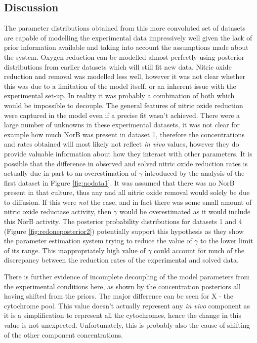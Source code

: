 \subsection{Discussion}
The parameter distributions obtained from this more convoluted set of datasets are capable of modelling the experimental data impressively well given the lack of prior information available and taking into account the assumptions made about the system. Oxygen reduction can be modelled almost perfectly using posterior distributions from earlier datasets which will still fit new data. Nitric oxide reduction and removal was modelled less well, however it was not clear whether this was due to a limitation of the model itself, or an inherent issue with the experimental set-up. In reality it was probably a combination of both which would be impossible to decouple. The general features of nitric oxide reduction were captured in the model even if a precise fit wasn't achieved. There were a large number of unknowns in these experimental datasets, it was not clear for example how much NorB was present in dataset 1, therefore the concentrations and rates obtained will most likely not reflect \textit{in vivo} values, 
however they do provide valuable information about how they interact with other parameters. It is possible that the difference in observed and solved nitric oxide reduction rates is actually due in part to an overestimation of $\gamma$ introduced by the analysis of the first dataset in Figure \ref{fig:nodata1}. It was assumed that there was no NorB present in that culture, thus any and all nitric oxide removal would solely be due to diffusion. If this were \textit{not} the case, and in fact there was some small amount of nitric oxide reductase activity, then $\gamma$ would be overestimated as it would include this NorB activity. The posterior probability distributions for datasets 1 and 4 (Figure \ref{fig:redoneposterior2}) potentially support this hypothesis as they show the parameter estimation system trying to reduce the value of $\gamma$ to the lower limit of its range. This inappropriately high value of $\gamma$ could account for much of the discrepancy between the reduction rates of the experimental 
and solved data.

There is further evidence of incomplete decoupling of the model parameters from the experimental conditions here, as shown by the concentration posteriors all having shifted from the priors. The major difference can be seen for X - the cytochrome pool. This value doesn't actually represent any \textit{in vivo} component as it is a simplification to represent all the cytochromes, hence the change in this value is not unexpected. Unfortunately, this is probably also the cause of shifting of the other component concentrations.

